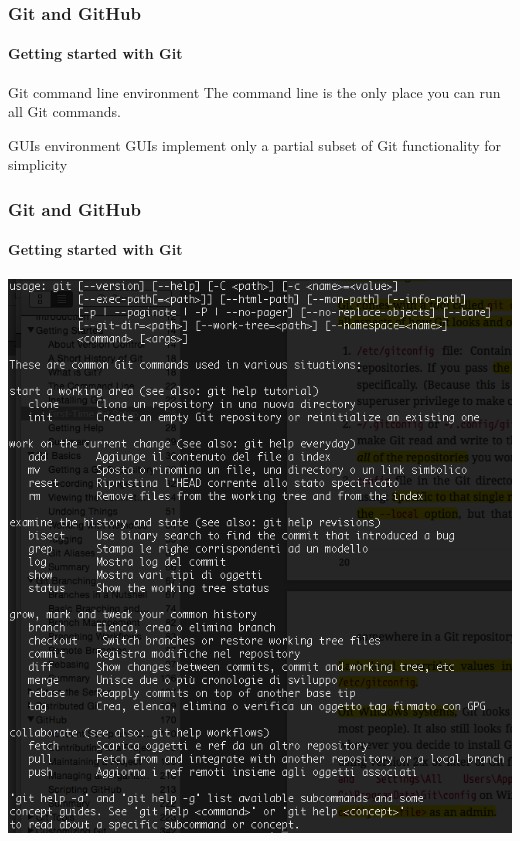 \begin{frame}
    \frametitle{Git and GitHub}
    \framesubtitle{Getting started with Git}
    \addtocounter{nframe}{1}
    
	\begin{block}{Git command line environment}
		The command line is the only place you can run all Git commands.
    \end{block}

	\begin{block}{GUIs environment}
		GUIs implement only a partial subset of Git functionality for simplicity
    \end{block}
	

\end{frame}

\begin{frame}
	\frametitle{Git and GitHub}
    \framesubtitle{Getting started with Git}
    \addtocounter{nframe}{1}

	\begin{center}
		\includegraphics[width=.8\textwidth]{imgs/git-commands.png}
	\end{center}

\end{frame}

